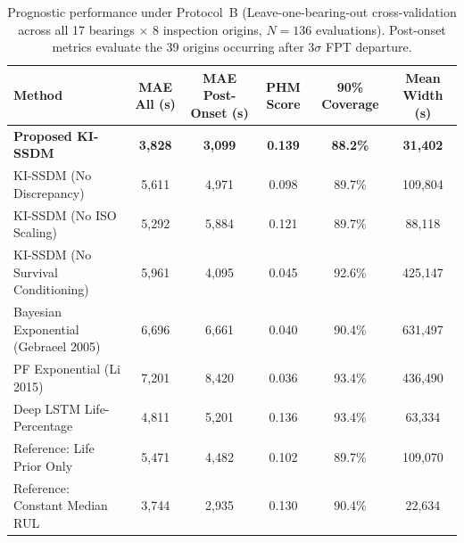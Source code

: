 \documentclass[11pt,a4paper]{article}
\begin{document}
\begin{table}[!t]
\centering
\caption{Prognostic performance under Protocol~B (Leave-one-bearing-out cross-validation across all 17 bearings $\times$ 8 inspection origins, $N=136$ evaluations). Post-onset metrics evaluate the 39 origins occurring after $3\sigma$ FPT departure.}
\label{tab:pronostia_protocol_b}
\small
\begin{tabular*}{\textwidth}{@{\extracolsep{\fill}}l c c c c c@{}}
\toprule
\textbf{Method} & \textbf{MAE All (s)} & \textbf{MAE Post-Onset (s)} & \textbf{PHM Score} & \textbf{90\% Coverage} & \textbf{Mean Width (s)} \\
\midrule
\textbf{Proposed KI-SSDM} & \textbf{3,828} & \textbf{3,099} & \textbf{0.139} & \textbf{88.2\%} & \textbf{31,402} \\
KI-SSDM (No Discrepancy) & 5,611 & 4,971 & 0.098 & 89.7\% & 109,804 \\
KI-SSDM (No ISO Scaling) & 5,292 & 5,884 & 0.121 & 89.7\% & 88,118 \\
KI-SSDM (No Survival Conditioning) & 5,961 & 4,095 & 0.045 & 92.6\% & 425,147 \\
\midrule
Bayesian Exponential (Gebraeel 2005) & 6,696 & 6,661 & 0.040 & 90.4\% & 631,497 \\
PF Exponential (Li 2015) & 7,201 & 8,420 & 0.036 & 93.4\% & 436,490 \\
Deep LSTM Life-Percentage & 4,811 & 5,201 & 0.136 & 93.4\% & 63,334 \\
\midrule
Reference: Life Prior Only & 5,471 & 4,482 & 0.102 & 89.7\% & 109,070 \\
Reference: Constant Median RUL & 3,744 & 2,935 & 0.130 & 90.4\% & 22,634 \\
\bottomrule
\end{tabular*}
\end{table}
\end{document}
